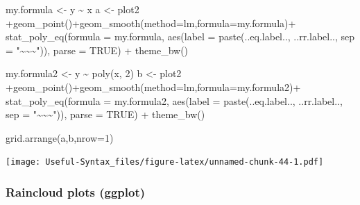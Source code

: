 \documentclass[
]{article}
\newenvironment{Shaded}{\begin{snugshade}}{\end{snugshade}}
\newcommand{\AttributeTok}[1]{\textcolor[rgb]{0.77,0.63,0.00}{#1}}
\newcommand{\ConstantTok}[1]{\textcolor[rgb]{0.00,0.00,0.00}{#1}}
\newcommand{\DecValTok}[1]{\textcolor[rgb]{0.00,0.00,0.81}{#1}}
\newcommand{\FunctionTok}[1]{\textcolor[rgb]{0.00,0.00,0.00}{#1}}
\newcommand{\NormalTok}[1]{#1}
\newcommand{\OtherTok}[1]{\textcolor[rgb]{0.56,0.35,0.01}{#1}}
\newcommand{\SpecialCharTok}[1]{\textcolor[rgb]{0.00,0.00,0.00}{#1}}
\newcommand{\StringTok}[1]{\textcolor[rgb]{0.31,0.60,0.02}{#1}}
\begin{document}
\begin{Shaded}
\begin{Highlighting}[]
\NormalTok{my.formula }\OtherTok{\textless{}{-}}\NormalTok{ y }\SpecialCharTok{\textasciitilde{}}\NormalTok{ x}
\NormalTok{a }\OtherTok{\textless{}{-}}\NormalTok{ plot2 }\SpecialCharTok{+}\FunctionTok{geom\_point}\NormalTok{()}\SpecialCharTok{+}\FunctionTok{geom\_smooth}\NormalTok{(}\AttributeTok{method=}\StringTok{\textquotesingle{}lm\textquotesingle{}}\NormalTok{,}\AttributeTok{formula=}\NormalTok{my.formula)}\SpecialCharTok{+}
  \FunctionTok{stat\_poly\_eq}\NormalTok{(}\AttributeTok{formula =}\NormalTok{ my.formula, }\FunctionTok{aes}\NormalTok{(}\AttributeTok{label =} \FunctionTok{paste}\NormalTok{(..eq.label.., ..rr.label..,}
                                                       \AttributeTok{sep =} \StringTok{"\textasciitilde{}\textasciitilde{}\textasciitilde{}"}\NormalTok{)), }\AttributeTok{parse =} \ConstantTok{TRUE}\NormalTok{) }\SpecialCharTok{+}
  \FunctionTok{theme\_bw}\NormalTok{()}

\NormalTok{my.formula2 }\OtherTok{\textless{}{-}}\NormalTok{ y }\SpecialCharTok{\textasciitilde{}} \FunctionTok{poly}\NormalTok{(x, }\DecValTok{2}\NormalTok{)}
\NormalTok{b }\OtherTok{\textless{}{-}}\NormalTok{ plot2 }\SpecialCharTok{+}\FunctionTok{geom\_point}\NormalTok{()}\SpecialCharTok{+}\FunctionTok{geom\_smooth}\NormalTok{(}\AttributeTok{method=}\StringTok{\textquotesingle{}lm\textquotesingle{}}\NormalTok{,}\AttributeTok{formula=}\NormalTok{my.formula2)}\SpecialCharTok{+}
  \FunctionTok{stat\_poly\_eq}\NormalTok{(}\AttributeTok{formula =}\NormalTok{ my.formula2, }\FunctionTok{aes}\NormalTok{(}\AttributeTok{label =} \FunctionTok{paste}\NormalTok{(..eq.label.., ..rr.label..,}
                                                        \AttributeTok{sep =} \StringTok{"\textasciitilde{}\textasciitilde{}\textasciitilde{}"}\NormalTok{)), }\AttributeTok{parse =} \ConstantTok{TRUE}\NormalTok{) }\SpecialCharTok{+}
  \FunctionTok{theme\_bw}\NormalTok{()}

\FunctionTok{grid.arrange}\NormalTok{(a,b,}\AttributeTok{nrow=}\DecValTok{1}\NormalTok{)}
\end{Highlighting}
\end{Shaded}

\texttt{[image: Useful-Syntax\_files/figure-latex/unnamed-chunk-44-1.pdf]}

\hypertarget{raincloud-plots-ggplot}{%
\subsubsection{Raincloud plots (ggplot)}\label{raincloud-plots-ggplot}}
\end{document}
